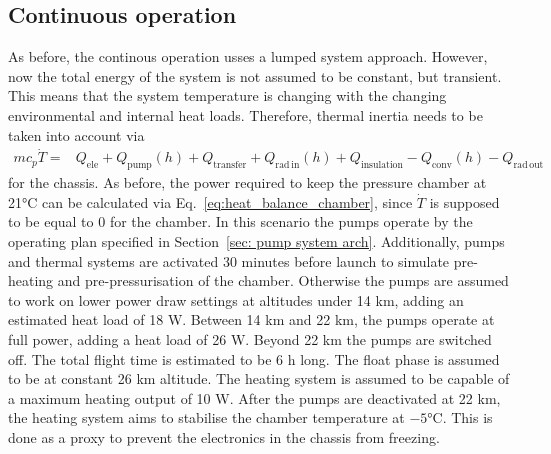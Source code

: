\documentclass[
  a4paper,
  11pt,
  openany,
  parskip,
  toc=totoc,
  listof=totoc,
  bibliography=totoc
]{scrreprt}
\newcommand{\sref}[1]{Section~\ref{#1}}
\renewcommand{\eqref}[1]{Eq.~\textup{\ref{#1}}}
\begin{document}
\subsection{Continuous operation}
As before, the continous operation usses a lumped system approach. However, now the total energy of the system is not assumed to be constant, but transient. This means that the system temperature is changing with the changing environmental and internal heat loads. Therefore, thermal inertia needs to be taken into account via
\begin{align}
    mc_{p}\dot{T} =& Q_\mathrm{ele}+Q_\mathrm{pump}(h)+Q_\mathrm{transfer} + Q_\mathrm{rad\,in}(h) + Q_\mathrm{insulation} - Q_\mathrm{conv}(h) - Q_\mathrm{rad\,out} \label{eq: heat diff chassis}
\end{align}
for the chassis. As before, the power required to keep the pressure chamber at 21°C can be calculated via \eqref{eq:heat_balance_chamber}, since $\dot{T}$ is supposed to be equal to 0 for the chamber. 
In this scenario the pumps operate by the operating plan specified in \sref{sec: pump system arch}. Additionally, pumps and thermal systems are activated 30 minutes before launch to simulate pre-heating and pre-pressurisation of the chamber. Otherwise the pumps are assumed to work on lower power draw settings at altitudes under 14 km, adding an estimated heat load of 18 W. Between 14 km and 22 km, the pumps operate at full power, adding a heat load of 26 W. Beyond 22 km the pumps are switched off. The total flight time is estimated to be 6 h long. 
The float phase is assumed to be at constant 26 km altitude. The heating system is assumed to be capable of a maximum heating output of 10 W.
After the pumps are deactivated at 22 km, the heating system aims to stabilise the chamber temperature at $-5$°C. This is done as a proxy to prevent the electronics in the chassis from freezing.\par 
\end{document}

